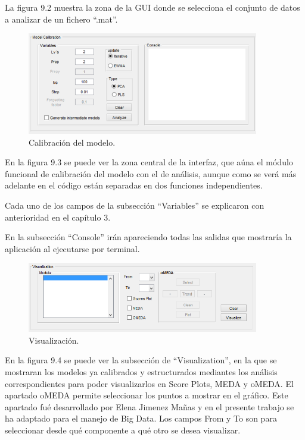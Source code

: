 \bigskip

La figura 9.2 muestra la zona de la GUI donde se selecciona el conjunto de datos a analizar de un fichero “.mat”.

\begin{figure}
\centering
\includegraphics[width=0.9\textwidth]{imagenes/figuras/9_3.png}
\caption{Calibración del modelo.}
\end{figure}

\bigskip

En la figura 9.3 se puede ver la zona central de la interfaz, que aúna el módulo funcional de calibración del modelo con el de análisis, aunque como se verá más adelante en el código están separadas en dos funciones independientes.

\bigskip

Cada uno de los campos de la subsección “Variables” se explicaron con anterioridad en el capítulo 3.
\bigskip

En la subsección “Console” irán apareciendo todas las salidas que mostraría la aplicación al ejecutarse por terminal. 

\begin{figure}
\centering
\includegraphics[width=0.9\textwidth]{imagenes/figuras/9_4.png}
\caption{Visualización.}
\end{figure}

\bigskip

En la figura 9.4 se puede ver la subsección de “Visualization”, en la que se mostraran los modelos ya calibrados y estructurados mediantes los análisis correspondientes para poder visualizarlos en Score Plots, MEDA y oMEDA. El apartado oMEDA permite seleccionar los puntos a mostrar en el gráfico. Este apartado fué desarrollado por Elena Jimenez Mañas \cite{PHPDAT} y en el presente trabajo se ha adaptado para el manejo de Big Data. Los campos From y To son para seleccionar desde qué componente a qué otro se desea visualizar.


